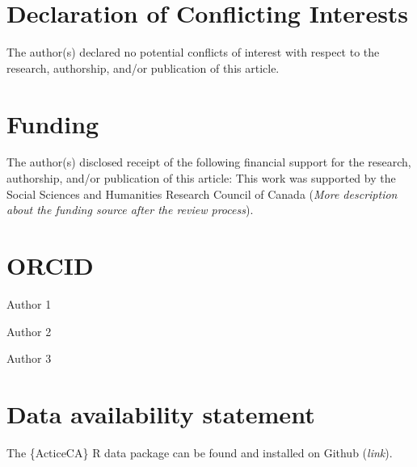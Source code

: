 \documentclass[Royal,times,sageh]{sagej}
\begin{document}
\hypertarget{declaration-of-conflicting-interests}{%
\section{Declaration of Conflicting
Interests}\label{declaration-of-conflicting-interests}}

The author(s) declared no potential conflicts of interest with respect
to the research, authorship, and/or publication of this article.

\hypertarget{funding}{%
\section{Funding}\label{funding}}

The author(s) disclosed receipt of the following financial support for
the research, authorship, and/or publication of this article: This work
was supported by the Social Sciences and Humanities Research Council of
Canada (\emph{More description about the funding source after the review
process}).

\hypertarget{orcid}{%
\section{ORCID}\label{orcid}}

Author 1

Author 2

Author 3

\hypertarget{data-availability-statement}{%
\section{Data availability
statement}\label{data-availability-statement}}

The \{ActiceCA\} R data package can be found and installed on Github
(\emph{link}).



\end{document}
